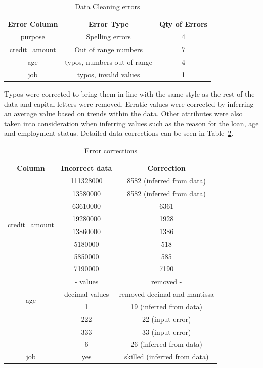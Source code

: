 \documentclass[12pt]{article}
\begin{document}
\begin{table}[h!]
\centering
\begin{tabular}{|c|c|c|}
\hline
\multicolumn{1}{|l|}{Error Column} & Error Type & \multicolumn{1}{r|}{Qty of Errors} \\ \hline
purpose & Spelling errors & 4 \\
credit\_amount & Out of range numbers & 7 \\
age & typos, numbers out of range & 4 \\
job & typos, invalid values & 1 \\ \hline
\end{tabular}
\caption{Data Cleaning errors}
\label{fig:data_cleaning}
\end{table}

Typos were corrected to bring them in line with the same style as the rest of the data and capital letters were removed. Erratic values were corrected by inferring an average value based on trends within the data. Other attributes were also taken into consideration when inferring values such as the reason for the loan, age and employment status. Detailed data corrections can be seen in Table~\ref{fig:error_corrections}.

\begin{table}
\centering
\begin{tabular}{|c|c|c|}
\hline
Column & Incorrect data & Correction \\ \hline
\multirow{8}{*}{credit\_amount} & 111328000 & 8582 (inferred from data) \\
 & 13580000 & 8582 (inferred from data) \\
 & 63610000 & 6361 \\
 & 19280000 & 1928 \\
 & 13860000 & 1386 \\
 & 5180000 & 518 \\
 & 5850000 & 585 \\
 & 7190000 & 7190 \\ \hline
\multirow{4}{*}{age} & - values & removed - \\
 & decimal values & removed decimal and mantissa \\
 & 1 & 19 (inferred from data) \\
 & 222 & 22 (input error) \\
 & 333 & 33 (input error) \\
 & 6 & 26 (inferred from data) \\ \hline
job & yes & skilled (inferred from data) \\ \hline
\end{tabular}
\caption{Error corrections}
\label{fig:error_corrections}
\end{table}
\end{document}
